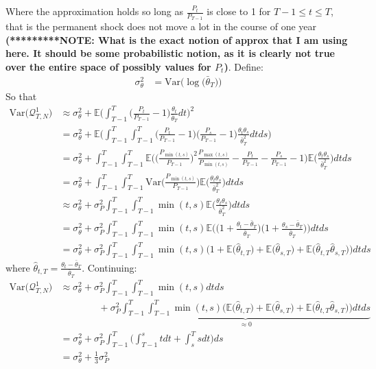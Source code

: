 Where the approximation holds so long as $\frac{P_{t}}{P_{T-1}}$ is close to 1 for $T-1 \leq t \leq T$, that is the permanent shock does not move a lot in the course of one year \textbf{(*********NOTE: What is the exact notion of approx that I am using here. It should be some probabilistic notion, as it is clearly not true over the entire space of possibly values for $P_t$)}. Define:
\begin{align*}
\sigma^2_{\theta}&= \mathrm{Var}\Bigg(\log \Big(\bar{\theta}_T \Big) \Bigg)
\end{align*}
So that
\begin{align*}
\mathrm{Var}\big(\mathcal{Q}^1_{T,N}\big) &\approx \sigma^2_{\theta} + \mathbb{E} \Bigg(\int_{T-1}^{T} \Big(\frac{P_t}{P_{T-1}}-1\Big)\frac{\theta_t}{\bar{\theta}_T} dt \Bigg)^2 \\
&= \sigma^2_{\theta} + \mathbb{E} \Bigg(\int_{T-1}^{T} \int_{T-1}^{T} \Big(\frac{P_t}{P_{T-1}}-1\Big) \Big(\frac{P_s}{P_{T-1}}-1\Big) \frac{\theta_t \theta_s}{\bar{\theta}_T^2}  dt ds \Bigg) \\
&= \sigma^2_{\theta} +  \int_{T-1}^{T} \int_{T-1}^{T} \mathbb{E}\Bigg(\Big(\frac{P_{\min(t,s)}}{P_{T-1}}\Big)^2 \frac{P_{\max(t,s)}}{P_{\min(t,s)}}-\frac{P_t}{P_{T-1}}-\frac{P_s}{P_{T-1}}-1\Bigg) \mathbb{E} \Bigg( \frac{\theta_t \theta_s}{\bar{\theta}_T^2} \Bigg)  dt ds \\
&= \sigma^2_{\theta} +    \int_{T-1}^{T} \int_{T-1}^{T} \mathrm{Var}\Bigg(\frac{P_{\min(t,s)}}{P_{T-1}} \Bigg) \mathbb{E}\Bigg( \frac{\theta_t \theta_s}{\bar{\theta}_T^2} \Bigg) dt ds \\
&\approx \sigma^2_{\theta} +  \sigma^2_P\int_{T-1}^{T} \int_{T-1}^{T}  \min(t,s)  \mathbb{E} \Bigg( \frac{\theta_t \theta_s}{\bar{\theta}_T^2} \Bigg) dt ds \\
&= \sigma^2_{\theta} +  \sigma^2_P\int_{T-1}^{T} \int_{T-1}^{T}  \min(t,s)  \mathbb{E} \Bigg(\Big( 1 +\frac{\theta_t-\bar{\theta}_T}{\bar{\theta}_T} \Big) \Big( 1 +\frac{\theta_s-\bar{\theta}_T}{\bar{\theta}_T} \Big)\Bigg) dt ds \\
&= \sigma^2_{\theta} +  \sigma^2_P\int_{T-1}^{T} \int_{T-1}^{T}  \min(t,s)   \Bigg(1+\mathbb{E}\Big( \hat{\theta}_{t,T} \Big) +\mathbb{E} \Big( \hat{\theta}_{s,T} \Big) +\mathbb{E}\Big( \hat{\theta}_{t,T} \hat{\theta}_{s,T}\Big)\Bigg) dt ds
\end{align*}
where $\hat{\theta}_{t,T} = \frac{\theta_t-\bar{\theta}_T}{\bar{\theta}_T}$. Continuing:
\begin{align*}
\mathrm{Var}\big(\mathcal{Q}^1_{T,N}\big) 
&\approx \sigma^2_{\theta} +  \sigma^2_P\int_{T-1}^{T} \int_{T-1}^{T}  \min(t,s)    dt ds \\
& \qquad \qquad +\sigma^2_P \underbrace{\int_{T-1}^{T} \int_{T-1}^{T}  \min(t,s)   \Bigg(\mathbb{E}\Big( \hat{\theta}_{t,T} \Big) +\mathbb{E} \Big( \hat{\theta}_{s,T} \Big) +\mathbb{E}\Big( \hat{\theta}_{t,T} \hat{\theta}_{s,T}\Big)\Bigg) dt ds }_{\approx 0} \\
&= \sigma^2_{\theta} +  \sigma^2_P\int_{T-1}^{T} \Bigg( \int_{T-1}^{s}  t dt +  \int_{s}^{T}  s dt\Bigg) ds \\
&= \sigma^2_{\theta} +  \frac{1}{3}\sigma^2_P
\end{align*}

